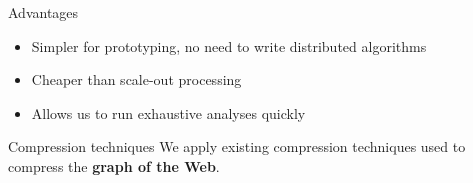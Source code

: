 \documentclass[aspectratio=169,xcolor=table]{beamer}
\begin{document}
\begin{frame}
        \begin{block}{Advantages}
            \begin{itemize}
                \item Simpler for prototyping, no need to write distributed
                    algorithms
                \item Cheaper than scale-out processing
                \item Allows us to run exhaustive analyses quickly
            \end{itemize}
        \end{block}

        \begin{block}{Compression techniques}
            We apply existing compression techniques used to compress the
            \textbf{graph of the Web}.
        \end{block}
    \end{frame}
\end{document}
